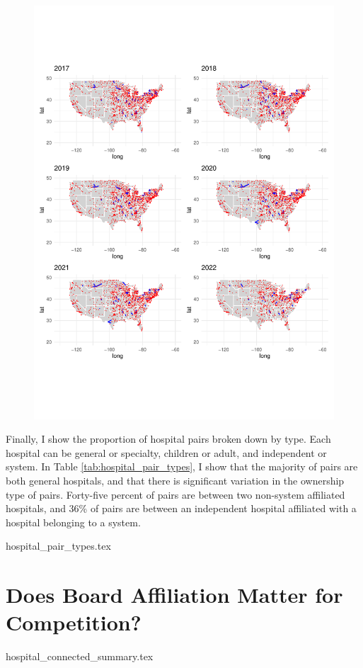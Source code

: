 \documentclass[12pt]{article}
\begin{document}
    \begin{figure}[ht!]
        \centering
        \includegraphics[width=\textwidth]{Objects/connected_maps.pdf}
        \label{fig:connected_maps}
    \end{figure}

    Finally, I show the proportion of hospital pairs broken down by type. Each hospital can be general or specialty, children or adult, and independent or system. In Table \ref{tab:hospital_pair_types}, I show that the majority of pairs are both general hospitals, and that there is significant variation in the ownership type of pairs. Forty-five percent of pairs are between two non-system affiliated hospitals, and 36\% of pairs are between an independent hospital affiliated with a hospital belonging to a system. 

    {hospital_pair_types.tex}


    \section{Does Board Affiliation Matter for Competition?}

    {hospital_connected_summary.tex}

    


    

    

    

    

    

	
	
	
\end{document}
